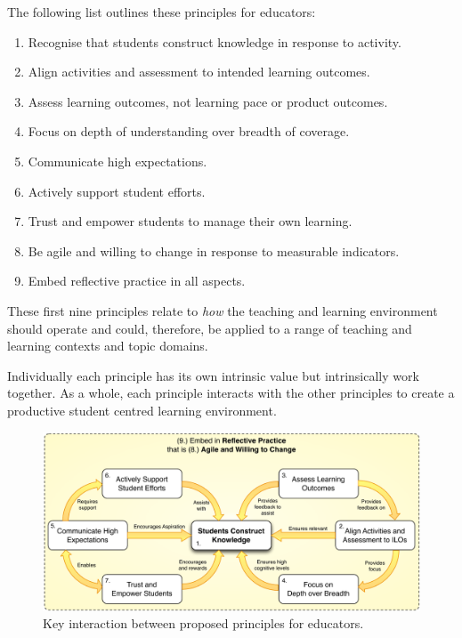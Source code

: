 The following list outlines these principles for educators:
\begin{enumerate}
	\item Recognise that students construct knowledge in response to activity.
	\item Align activities and assessment to intended learning outcomes.
	\item Assess learning outcomes, not learning pace or product outcomes.
	\item Focus on depth of understanding over breadth of coverage.
	\item Communicate high expectations.
	\item Actively support student efforts.
	\item Trust and empower students to manage their own learning.
	\item Be agile and willing to change in response to measurable indicators.
	\item Embed reflective practice in all aspects.
\end{enumerate}

These first nine principles relate to \emph{how} the teaching and learning environment should operate and could, therefore, be applied to a range of teaching and learning contexts and topic domains.


Individually each principle has its own intrinsic value but intrinsically work together. As a whole, each principle interacts with the other principles to create a productive student centred learning environment.

\begin{figure}[htbp]
	\centering
	\includegraphics[width=\textwidth]{HowPrinciples}
	\caption{Key interaction between proposed principles for educators.}
	\label{fig:how_principles}
\end{figure}

